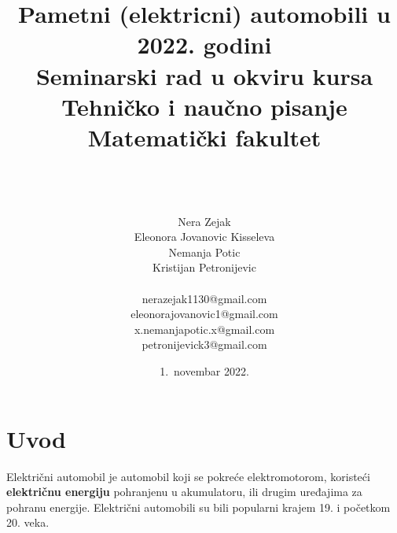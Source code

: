 \documentclass[a4paper]{article}
\begin{document}
\title{Pametni (elektricni) automobili u 2022. godini\vspace{3ex}\\ \small{Seminarski rad u okviru kursa\\Tehničko i naučno pisanje\\ Matematički fakultet}}

\author{\\\\\\Nera Zejak\\Eleonora Jovanovic Kisseleva\\Nemanja Potic\\Kristijan Petronijevic \\ \\nerazejak1130@gmail.com\\eleonorajovanovic1@gmail.com\\x.nemanjapotic.x@gmail.com\\ petronijevick3@gmail.com\\}
\date{1.~novembar 2022.}
\maketitle



\tableofcontents

\newpage

\section{Uvod}
   Električni automobil je automobil koji se pokreće elektromotorom, koristeći \textbf{električnu energiju} pohranjenu u akumulatoru, ili drugim uređajima za pohranu energije. Električni automobili su bili popularni krajem 19. i početkom 20. veka. 
        
\end{document}
